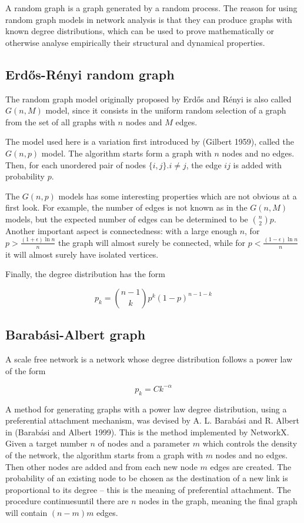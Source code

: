 \documentclass[oneside,openany]{memoir}
\begin{document}
A random graph is a graph generated by a random process. The reason for
using random graph models in network analysis is that they can produce
graphs with known degree distributions, which can be used to prove
mathematically or otherwise analyse empirically their structural and
dynamical properties.

\subsection{Erd\H{o}s-Rényi random
graph}\label{erdos-renyi-random-graph}

The random graph model originally proposed by Erd\H{o}s and Rényi is
also called $G(n,M)$ model, since it consists in the uniform random
selection of a graph from the set of all graphs with $n$ nodes and $M$
edges.

The model used here is a variation first introduced by (Gilbert 1959),
called the $G(n,p)$ model. The algorithm starts form a graph with $n$
nodes and no edges. Then, for each unordered pair of nodes
$\{i,j\} . i \neq j$, the edge $ij$ is added with probability $p$.

The $G(n,p)$ models has some interesting properties which are not
obvious at a first look. For example, the number of edges is not known
as in the $G(n,M)$ models, but the expected number of edges can be
determined to be $\binom{n}{2}p$. Another important aspect is
connectedness: with a large enough $n$,
for $p > \frac{(1+\epsilon) \ln n}{n}$ the graph will
almost surely be connected, while for $p < \frac{(1-\epsilon) \ln n}{n}$
it will almost surely have isolated vertices.

Finally, the degree distribution has the form

\begin{equation}
p_k = \binom{n-1}{k} p^k (1-p)^{n-1-k}
\end{equation}

\subsection{Barabási-Albert graph}\label{barabuxe1si-albert-graph}

A scale free network is a network whose degree distribution follows a
power law of the form

\begin{equation}
p_k = Ck^{-\alpha}
\end{equation}

A method for generating graphs with a power law degree distribution,
using a preferential attachment mechanism, was devised by A. L. Barabási
and R. Albert in (Barabási and Albert 1999). This is the method
implemented by NetworkX. Given a target number $n$ of nodes and a
parameter $m$ which controls the density of the network, the algorithm
starts from a graph with $m$ nodes and no edges. Then other nodes are
added and from each new node $m$ edges are created. The probability of an
existing node to be chosen as the destination of a new link is proportional
to its degree -- this is the meaning of preferential attachment.
The procedure continuesuntil there are $n$ nodes in the graph,
meaning the final graph will contain $(n-m) m$ edges.
\end{document}
